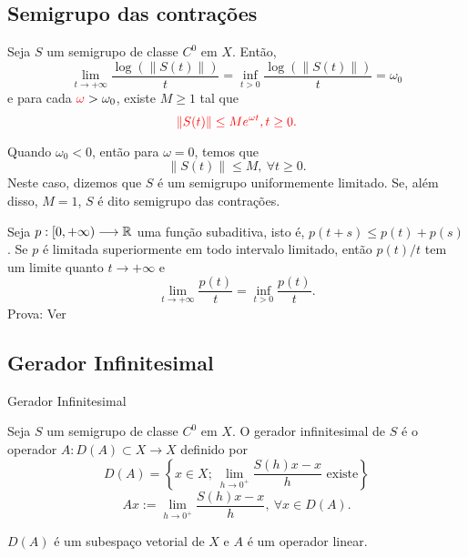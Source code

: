 \subsection*{Semigrupo das contrações}
\begin{frame}{}
\begin{teo}
Seja $S$ um semigrupo de classe $C^0$ em $X$. Então,
\[\lim\limits_{t\to +\infty}\frac{\log(\|S(t)\|)}{t}=\inf\limits_{t>0}\frac{\log(\|S(t)\|)}{t}=\omega_0\]
e para cada ${\color{red}\omega}>\omega_0$, existe {\color{red}$M\geq 1$} tal que 
\begin{equation*}
{\color{red}\|S(t)\|\leq Me^{\omega t}, t\geq 0.}
\end{equation*}
\end{teo} 
Quando $\omega_0<0$, então para $\omega=0$, temos que 
\[\|S(t)\|\leq M,\ \forall t\geq 0. \]
Neste caso, dizemos que $S$ é um {\color{blue} semigrupo uniformemente limitado}. Se, além disso, $M=1$, $S$ é dito {\color{blue} semigrupo das contrações}.

\end{frame}

\begin{frame}{ }
\begin{lema}
    Seja $p:[0,+\infty)\longrightarrow \mathbb{R}$ uma função {\color{blue}subaditiva}, isto é, $p(t+s)\leq p(t)+p(s)$. Se $p$ é limitada superiormente em todo intervalo limitado, então $p(t)/t$ tem um limite quanto $t\to +\infty$ e 
    \[\lim\limits_{t\to +\infty}\frac{p(t)}{t}=\inf\limits_{t>0}\frac{p(t)}{t}.\]
Prova: Ver \cite[Lema 1.2.5]{alvercio} 
\end{lema}
\end{frame}

\subsection*{Gerador Infinitesimal}
\begin{frame}{Gerador Infinitesimal }

\begin{defin}
Seja $S$ um semigrupo de classe $C^0$ em $X$. O {\color{blue}gerador infinitesimal} de $S$ é o operador $A:D(A)\subset X\longrightarrow X$ definido por 
\[D(A)=\left\{x\in X;\ \lim\limits_{h\to 0^+} \frac{S(h)x-x}{h} \text{ existe}\right\}\]
\[Ax:=\lim\limits_{h\to 0^+} \frac{S(h)x-x}{h},\ \forall x\in D(A).\]
\end{defin}
\begin{prop}
    $D(A)$ é um subespaço vetorial de $X$ e $A$ é um operador linear.
\end{prop}

\end{frame}

